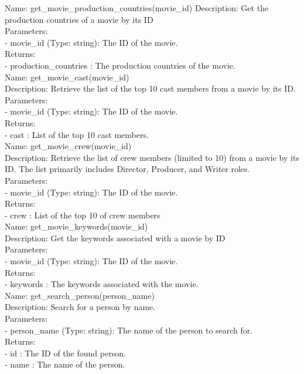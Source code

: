 \begin{tcolorbox}[breakable,title=Prompt Details for Movie]
Name: get\_movie\_production\_countries(movie\_id)
Description: Get the production countries of a movie by its ID\\
Parameters:\\
- movie\_id (Type: string): The ID of the movie.\\
Returns:\\
- production\_countries : The production countries of the movie.\\

Name: get\_movie\_cast(movie\_id)\\
Description: Retrieve the list of the top 10 cast members from a movie by its ID.\\
Parameters:\\
- movie\_id (Type: string): The ID of the movie.\\
Returns:\\
- cast : List of the top 10 cast members.\\

Name: get\_movie\_crew(movie\_id)\\
Description: Retrieve the list of crew members (limited to 10) from a movie by its ID. The list primarily includes Director, Producer, and Writer roles.\\
Parameters:\\
- movie\_id (Type: string): The ID of the movie.\\
Returns:\\
- crew : List of the top 10 of crew members\\

Name: get\_movie\_keywords(movie\_id)\\
Description: Get the keywords associated with a movie by ID\\
Parameters:\\
- movie\_id (Type: string): The ID of the movie.\\
Returns:\\
- keywords : The keywords associated with the movie.\\

Name: get\_search\_person(person\_name)\\
Description: Search for a person by name.\\
Parameters:\\
- person\_name (Type: string): The name of the person to search for.\\
Returns:\\
- id : The ID of the found person.\\
- name : The name of the person.\\


\end{tcolorbox}

